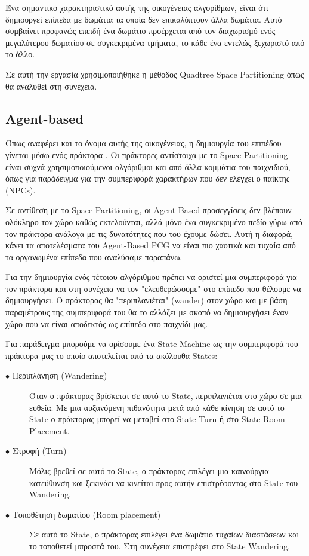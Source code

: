 Ένα σημαντικό χαρακτηριστικό αυτής της οικογένειας αλγορίθμων, είναι ότι δημιουργεί επίπεδα με δωμάτια τα οποία δεν επικαλύπτουν άλλα δωμάτια. Αυτό συμβαίνει προφανώς επειδή ένα δωμάτιο προέρχεται από τον διαχωρισμό ενός μεγαλύτερου δωματίου σε συγκεκριμένα τμήματα, το κάθε ένα εντελώς ξεχωριστό από το άλλο.
\par
Σε αυτή την εργασία χρησιμοποιήθηκε η μέθοδος Quadtree Space Partitioning όπως θα αναλυθεί στη συνέχεια.


\subsection{Agent-based}
Όπως αναφέρει και το όνομα αυτής της οικογένειας, η δημιουργία του επιπέδου γίνεται μέσω ενός πράκτορα \cite{agents}. Οι πράκτορες αντίστοιχα με το Space Partitioning είναι συχνά χρησιμοποιούμενοι αλγόριθμοι και από άλλα κομμάτια του παιχνιδιού, όπως για παράδειγμα για την συμπεριφορά χαρακτήρων που δεν ελέγχει ο παίκτης (NPCs).
\par
Σε αντίθεση με το Space Partitioning, οι Agent-Based προσεγγίσεις δεν βλέπουν ολόκληρο τον χώρο καθώς εκτελούνται, αλλά μόνο ένα συγκεκριμένο πεδίο γύρω από τον πράκτορα ανάλογα με τις δυνατότητες που του έχουμε δώσει. Αυτή η διαφορά, κάνει τα αποτελέσματα του Agent-Based PCG να είναι πιο χαοτικά και τυχαία από τα οργανωμένα επίπεδα που αναλύσαμε παραπάνω.
\par
Για την δημιουργία ενός τέτοιου αλγόριθμου πρέπει να οριστεί μια συμπεριφορά για τον πράκτορα και στη συνέχεια να τον "ελευθερώσουμε" στο επίπεδο που θέλουμε να δημιουργήσει. Ο πράκτορας θα "περιπλανιέται" (wander) στον χώρο και με βάση παραμέτρους της συμπεριφορά του θα το αλλάζει με σκοπό να δημιουργήσει έναν χώρο που να είναι αποδεκτός ως επίπεδο στο παιχνίδι μας.
\par
Για παράδειγμα μπορούμε να ορίσουμε ένα State Machine ως την συμπεριφορά του πράκτορα μας το οποίο αποτελείται από τα ακόλουθα States:
\begin{description}
  \item[$\bullet$ Περιπλάνηση (Wandering)] Όταν ο πράκτορας βρίσκεται σε αυτό το State, περιπλανιέται στο χώρο σε μια ευθεία. Με μια αυξανόμενη πιθανότητα μετά από κάθε κίνηση σε αυτό το State ο πράκτορας μπορεί να μεταβεί στο State Turn ή στο State Room Placement.
  \item[$\bullet$ Στροφή (Turn)] Μόλις βρεθεί σε αυτό το State, ο πράκτορας επιλέγει μια καινούργια κατεύθυνση και ξεκινάει να κινείται προς αυτήν επιστρέφοντας στο State του Wandering. 
    \item[$\bullet$ Τοποθέτηση δωματίου (Room placement)] Σε αυτό το State, ο πράκτορας επιλέγει ένα δωμάτιο τυχαίων διαστάσεων και το τοποθετεί μπροστά του. Στη συνέχεια επιστρέφει στο State Wandering.
\end{description}

